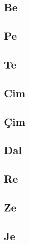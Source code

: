 \uyumluharftablo{\aralif}{\Lalif\latdownalif}{\isimalif}{\trtlfalif}



\subsection*{Be}
\uyumluharftablo{\arbe}{\Lbe\latdownbe}{\isimbe}{\trtlfbe}


\subsection*{Pe}
\uyumluharftablo{\arpe}{\Lpe\latdownpe}{\isimpe}{\trtlfpe}

\subsection*{Te}
\uyumluharftablo{\arte}{\Lte\latdownte}{\isimte}{\trtlfte}

\subsection*{Cim}
\uyumluharftablo{\arcim}{\Lcim\latdowncim}{\isimcim}{\trtlfcim}

\subsection*{Çim}
\uyumluharftablo{\archim}{\Lchim\latdownchim}{\isimchim}{\trtlfchim}


\subsection*{Dal}
\uyumluharftablo{\ardal}{\Ldal\latdowndal}{\isimdal}{\trtlfdal}

\subsection*{Re}
\uyumluharftablo{\arre}{\Lre\latdownre}{\isimre}{\trtlfre}

\subsection*{Ze}
\uyumluharftablo{\arze}{\Lze\latdownze}{\isimze}{\trtlfze}

\subsection*{Je}
\uyumluharftablo{\arje}{\Lje\latdownje}{\isimje}{\trtlfje}

